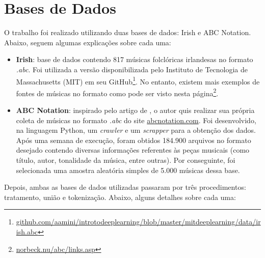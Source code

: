 \documentclass[twoside]{automatextcc}
\begin{document}
\section{Bases de Dados}
O trabalho foi realizado utilizando duas bases de dados: Irish e ABC Notation. Abaixo, seguem algumas explicações sobre cada uma:
\begin{itemize}
    \item \textbf{Irish}: base de dados contendo 817 músicas folclóricas irlandesas no formato \textit{.abc}. Foi utilizada a versão disponibilizada pelo Instituto de Tecnologia de Massachusetts (MIT) em seu GitHub\footnote{\href{https://github.com/aamini/introtodeeplearning/blob/master/mitdeeplearning/data/irish.abc}{\url{github.com/aamini/introtodeeplearning/blob/master/mitdeeplearning/data/irish.abc}}}. No entanto, existem mais exemplos de fontes de músicas no formato como pode ser visto nesta página\footnote{\href{https://www.norbeck.nu/abc/links.asp}{\url{norbeck.nu/abc/links.asp}}}.
    \item \textbf{ABC Notation}: inspirado pelo artigo de \citet{agarwala2017}, o autor quis realizar sua própria coleta de músicas no formato \textit{.abc} do site \href{https://abcnotation.com/}{abcnotation.com}. Foi desenvolvido, na linguagem Python, um \textit{crawler} e um \textit{scrapper} para a obtenção dos dados. Após uma semana de execução, foram obtidos 184.900 arquivos no formato desejado contendo diversas informações referentes às peças musicais (como título, autor, tonalidade da música, entre outras). Por conseguinte, foi selecionada uma amostra aleatória simples de 5.000 músicas dessa base.
\end{itemize}
Depois, ambas as bases de dados utilizadas passaram por três procedimentos: tratamento, união e tokenização. Abaixo, alguns detalhes sobre cada uma:
\end{document}
